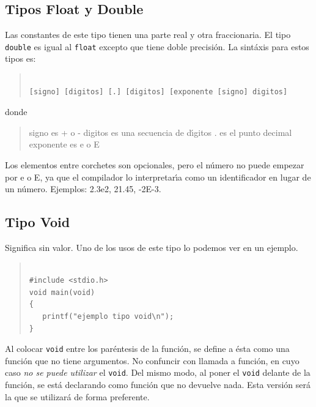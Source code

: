 \subsection{Tipos Float y Double}


Las constantes de este tipo tienen una parte real y otra fraccionaria. El tipo
\texttt{double} es igual al \texttt{float} excepto que tiene doble precisi\'on.
La sint\'axis para estos tipos es:

\begin{quotation}
\begin{verbatim}

[signo] [digitos] [.] [digitos] [exponente [signo] digitos]

\end{verbatim}
\end{quotation}

donde

\begin{quotation}

signo es + o -
digitos es una secuencia de d\'{\i}gitos
. es el punto decimal
exponente es e o E

\end{quotation}

Los elementos entre corchetes son opcionales, pero el n\'umero no puede
empezar por e o E, ya que el compilador lo interpretar\'{\i}a como un 
identificador en lugar de un n\'umero. Ejemplos: 2.3e2, 21.45, -2E-3.

\subsection{Tipo Void}


Significa sin valor. Uno de los usos de este tipo lo podemos ver en un ejemplo.

\begin{quotation}
\begin{verbatim}

#include <stdio.h>
void main(void)
{
   printf("ejemplo tipo void\n");
}

\end{verbatim}
\end{quotation}

Al colocar \texttt{void} entre los par\'entesis de la funci\'on, se define a 
\'esta como una funci\'on que no tiene argumentos. No confuncir con llamada a 
funci\'on, en cuyo caso \emph{no se puede utilizar} el \texttt{void}. Del mismo
modo, al poner el \texttt{void} delante de la funci\'on, se est\'a declarando
como funci\'on que no devuelve nada. Esta versi\'on ser\'a la que se 
utilizar\'a de forma preferente.

